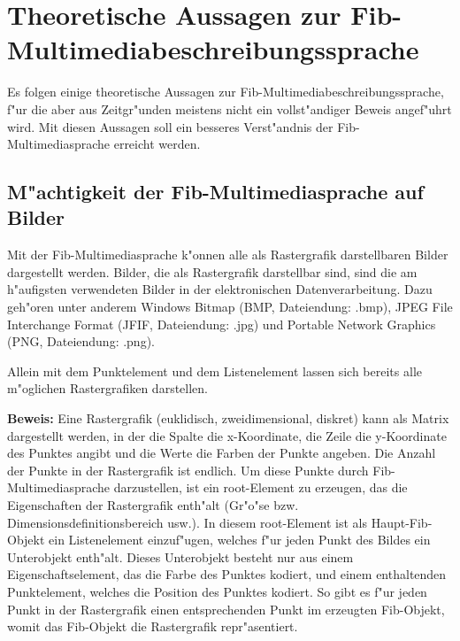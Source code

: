 %
%
%
%

\section{Theoretische Aussagen zur Fib-Multi\-media\-be\-schrei\-bungs\-sprache}
\label{secTheoreticFib}

Es folgen einige theoretische Aussagen zur Fib-Multimediabeschreibungssprache, f"ur die aber aus Zeitgr"unden meistens nicht ein vollst"andiger Beweis angef"uhrt wird. Mit diesen Aussagen soll ein besseres Verst"andnis der Fib-Multimediasprache erreicht werden.


\subsection{M"achtigkeit der Fib-Multimediasprache auf Bilder}
\label{secPowerOfFibOnPictures}

Mit der Fib-Multimediasprache k"onnen alle als Rastergrafik darstellbaren Bilder dargestellt werden. Bilder, die als Rastergrafik darstellbar sind, sind die am h"aufigsten verwendeten Bilder in der elektronischen Datenverarbeitung. Dazu geh"oren unter anderem Windows Bitmap (BMP, Dateiendung: .bmp), JPEG File Interchange Format (JFIF, Dateiendung: .jpg) und Portable Network Graphics (PNG, Dateiendung: .png).

Allein mit dem Punktelement und dem Listenelement lassen sich bereits alle m"oglichen Rastergrafiken darstellen.

\bigskip\noindent
\textbf{Beweis:}
Eine Rastergrafik (euklidisch, zweidimensional, diskret) kann als Matrix dargestellt werden, in der die Spalte die x-Koordinate, die Zeile die y-Koordinate des Punktes angibt und die Werte die Farben der Punkte angeben. Die Anzahl der Punkte in der Rastergrafik ist endlich. Um diese Punkte durch Fib-Multimediasprache darzustellen, ist ein root-Element zu erzeugen, das die Eigenschaften der Rastergrafik enth"alt (Gr"o"se bzw. Dimensionsdefinitionsbereich usw.). In diesem root-Element ist als Haupt-Fib-Objekt ein Listenelement einzuf"ugen, welches f"ur jeden Punkt des Bildes ein Unterobjekt enth"alt. Dieses Unterobjekt besteht nur aus einem Eigenschaftselement, das die Farbe des Punktes kodiert, und einem enthaltenden Punktelement, welches die Position des Punktes kodiert. So gibt es f"ur jeden Punkt in der Rastergrafik einen entsprechenden Punkt im erzeugten Fib-Objekt, womit das Fib-Objekt die Rastergrafik repr"asentiert.

